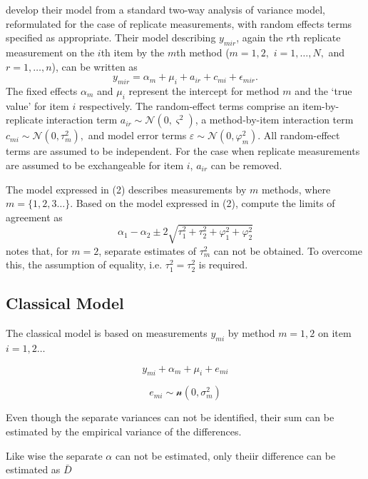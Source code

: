 \documentclass[12pt, a4paper]{report}
\theoremstyle{plain}
\theoremstyle{definition}
\theoremstyle{remark}
\begin{document}
		\citet{BXC2008} develop their model from a standard two-way analysis of variance model, reformulated for the case of replicate measurements, with random effects terms specified as appropriate. 
		Their model describing $y_{mir} $, again the $r$th replicate measurement on the $i$th item by the $m$th method ($m=1,2,$ $i=1,\ldots,N,$ and $r = 1,\ldots,n$), can be written as
		\begin{equation}\label{BXC-model}
		y_{mir}  = \alpha_{m} + \mu_{i} + a_{ir} + c_{mi} + \epsilon_{mir}.
		\end{equation}
		The fixed effects $\alpha_{m}$ and $\mu_{i}$  represent the intercept for method $m$ and the `true value' for item $i$ respectively. The random-effect terms comprise an item-by-replicate interaction term $a_{ir} \sim \mathcal{N}(0,\varsigma^{2})$, a method-by-item interaction term $c_{mi} \sim \mathcal{N}(0,\tau^{2}_{m}),$ and model error terms $\varepsilon \sim \mathcal{N}(0,\varphi^{2}_{m}).$ All random-effect terms are assumed to be independent.
		For the case when replicate measurements are assumed to be exchangeable for item $i$, $a_{ir}$ can be removed.
		
		The model expressed in (2) describes measurements by $m$ methods, where $m = \{1,2,3\ldots\}$. Based on the model expressed in (2), \citet{BXC2008} compute the limits of agreement as
		\[
		\alpha_1 - \alpha_2 \pm 2 \sqrt{ \tau^2_1 +  \tau^2_2 +  \varphi^2_1 +  \varphi^2_2 }
		\]
		\citet{BXC2008} notes that, for $m=2$,  separate estimates of $\tau^2_m$ can not be obtained. To overcome this, the assumption of equality, i.e. $\tau^2_1 = \tau^2_2$ is required.
		
		
		

\subsection{Classical Model}
The classical model is based on measurements $y_{mi}$
by method $m=1,2$ on item $i = 1,2 \ldots$

\[y_{mi} + \alpha_{m} + \mu_{i} + e_{mi}\]

\[e_{mi} \sim \mathcal{n} (0,\sigma^2_m)\]

Even though the separate variances can not be
identified, their sum can be estimated by the empirical variance of the differences.

Like wise the separate $\alpha$ can not be
estimated, only theiir difference can be estimated as
$\bar{D}$




\end{document}
